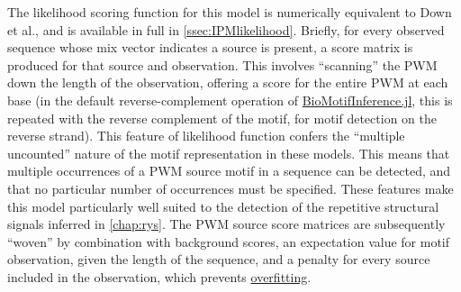 The likelihood scoring function for this model is numerically equivalent to Down et al., and is available in full in \autoref{ssec:IPMlikelihood}. Briefly, for every observed sequence whose mix vector indicates a source is present, a score matrix is produced for that source and observation. This involves ``scanning'' the PWM down the length of the observation, offering a score for the entire PWM at each base (in the default reverse-complement operation of \hyperref[chap:BMI]{BioMotifInference.jl}, this is repeated with the reverse complement of the motif, for motif detection on the reverse strand). This feature of likelihood function confers the ``multiple uncounted'' nature of the motif representation in these models. This means that multiple occurrences of a PWM source motif in a sequence can be detected, and that no particular number of occurrences must be specified. These features make this model particularly well suited to the detection of the repetitive structural signals inferred in \autoref{chap:rys}. The PWM source score matrices are subsequently ``woven'' by combination with background scores, an expectation value for motif observation, given the length of the sequence, and a penalty for every source included in the observation, which prevents \hyperref[ssec:overfit]{overfitting}.

